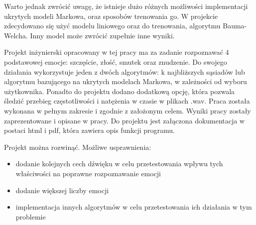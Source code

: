 \documentclass[declaration,shortabstract]{iithesis}
\begin{document}
Warto jednak zwrócić uwagę, że istnieje dużo różnych możliwości implementacji ukrytych modeli Markowa, oraz sposobów trenowania go. W projekcie zdecydowano się użyć modelu liniowego oraz do trenowania, algorytmu Bauma-Welcha. Inny model może zwrócić zupełnie inne wyniki.

Projekt inżynierski opracowany w tej pracy ma za zadanie rozpoznawać 4 podstawowej emocje: szczęście, złość, smutek oraz znudzenie. Do swojego działania wykorzystuje jeden z dwóch algorytmów: k najbliższych sąsiadów lub algorytmu bazującego na ukrytych modelach Markowa, w zależności od wyboru użytkownika. Ponadto do projektu dodano dodatkową opcję, która pozwala śledzić przebieg częstotliwości i natężenia w czasie w plikach .wav. Praca została wykonana w pełnym zakresie i zgodnie z założonym celem. Wyniki pracy zostały zaprezentowane i opisane w pracy. Do projektu jest załączona dokumentacja w postaci html i pdf, która zawiera opis funkcji programu.

Projekt można rozwinąć. Możliwe usprawnienia:
\begin{itemize}
\item dodanie kolejnych cech dźwięku w celu przetestowania wpływu tych właściwości na poprawne rozpoznawanie emocji
\item dodanie większej liczby emocji
\item implementacja innych algorytmów w celu przetestowania ich działania w tym problemie
\end{itemize}

\listoffigures
\listoftables
\end{document}
